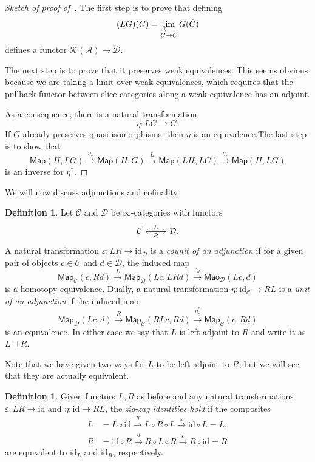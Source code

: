 \documentclass[10pt, oneside]{memoir}
\theoremstyle{definition}
\newtheorem{defn}[thm]{Definition}
\theoremstyle{remark}
\theoremstyle{plain}
\theoremstyle{definition}
\theoremstyle{remark}
\newcommand{\ep}{\varepsilon}
\newcommand{\mc}[1]{\mathcal{#1}}
\newcommand{\mr}[1]{\mathrm{#1}}
\newcommand{\ms}[1]{\mathsf{#1}}
\newcommand{\1}{\mathbf{1}}
\newcommand{\2}{\mathbf{2}}
\newcommand{\3}{\mathbf{3}}
\begin{document}
\begin{proof}[Sketch of proof of~]
    The first step is to prove that defining
    \[ (LG)(C) = \varprojlim_{\hat{C} \to C} G(\hat{C}) \]
    defines a functor \(\mc{K}(\mc{A}) \to \mc{D} \).

    The next step is to prove that it preserves weak equivalences. This seems obvious because we are taking a limit over weak equivalences, which requires that the pullback functor between slice categories along a weak equivalence has an adjoint.

    As a consequence, there is a natural transformation
    \[ \eta \colon LG \to G. \]
    If \(G \) already preserves quasi-isomorphisms, then \(\eta \) is an equivalence.The last step is to show that
    \[ \ms{Map}(H, LG) \xrightarrow{\eta_*} \ms{Map}(H, G) \xrightarrow{L} \ms{Map}(LH, LG) \xrightarrow{\eta_*} \ms{Map}(H, LG) \]
    is an inverse for \(\eta^* \).
\end{proof}

We will now discuss adjunctions and cofinality.

\begin{defn}
    Let \(\mc{C} \) and \(\mc{D} \) be \(\infty \)-categories with functors
    \begin{equation*}
    \begin{tikzcd}
        \mc{C} \ar{r}{L} & \mc{D} \ar{l}{R}.
    \end{tikzcd}
    \end{equation*}
    A natural transformation \(\ep \colon LR \to \mr{id}_{\mc{D}} \) is a \textit{counit of an adjunction} if for a given pair of objects \(c \in \mc{C} \) and \(d \in \mc{D} \), the induced map
    \[ \ms{Map}_{\mc{C}}(c, Rd) \xrightarrow{L} \ms{Map}_{\mc{D}}(Lc, LRd) \xrightarrow{\ep_d} \ms{Mao}_{\mc{D}}(Lc, d) \]
    is a homotopy equivalence. Dually, a natural transformation \(\eta \colon \mr{id}_{\mc{C}} \to RL \) is a \textit{unit of an adjunction} if the induced mao
    \[ \ms{Map}_{\mc{D}}(Lc, d) \xrightarrow{R} \ms{Map}_{\mc{C}}(RL c, Rd) \xrightarrow{\eta_c^*} \ms{Map}_{\mc{C}}(c, Rd) \]
    is an equivalence. In either case we say that \(L \) is left adjoint to \(R \) and write it as \(L \dashv R \).
\end{defn}

Note that we have given two ways for \(L \) to be left adjoint to \(R \), but we will see that they are actually equivalent. 

\begin{defn}
    Given functors \(L, R \) as before and any natural transformations \(\ep \colon LR \to \mr{id} \) and \(\eta \colon \mr{id} \to RL \), the \textit{zig-zag identities hold} if the composites
    \begin{align*}
        L &= L \circ \mr{id} \xrightarrow{\eta} L \circ R \circ L \xrightarrow{\ep} \mr{id} \circ L = L, \\
        R &= \mr{id} \circ R \xrightarrow{\eta} R \circ L \circ R \xrightarrow{\ep} R \circ \mr{id} = R
    \end{align*}
    are equivalent to \(\mr{id}_L \) and \(\mr{id}_R \), respectively.
\end{defn}
\end{document}

